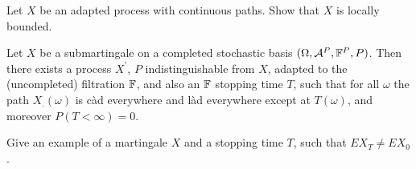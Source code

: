 Let $X$ be an adapted process with
continuous paths. Show that $X$ is locally bounded.

 Let $X$ be a
submartingale on a completed stochastic basis $(\Omega, \mathcal A^{P}, \mathbb F^{P}, P)$. Then
there exists a process $X^{'}$, $P$ indistinguishable from $X$, adapted to the
(uncompleted) filtration $\mathbb F$, and also an $\mathbb F$ stopping time $T$, such that
for all $\omega$ the path $X_{.}(\omega)$ is c\`ad everywhere and l\`ad
everywhere except at $T(\omega)$, and moreover $P(T<\infty)=0$. 

 Give an example
of a martingale $X$ and a stopping time $T$, such that $E X_{T} \neq E X_{0}$. 


